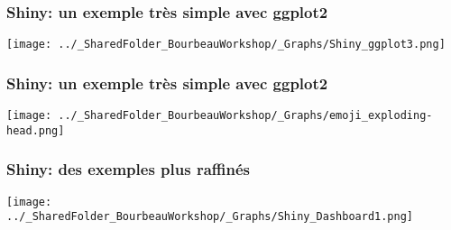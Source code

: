 \documentclass{beamer}
\begin{document}

    \begin{frame}
    
      \frametitle{Shiny: un exemple très simple avec ggplot2} \vspace{1cm}
      
        \begin{center}
      	  \texttt{[image: ../\_SharedFolder\_BourbeauWorkshop/\_Graphs/Shiny\_ggplot3.png]}
        \end{center} 
      
          
    \end{frame} 
    

    \begin{frame}
    
      \frametitle{Shiny: un exemple très simple avec ggplot2} \vspace{1cm}
      
        \begin{center}
      	  \texttt{[image: ../\_SharedFolder\_BourbeauWorkshop/\_Graphs/emoji\_exploding-head.png]}
        \end{center} 
      
          
    \end{frame}     
    
    

    \begin{frame}
    
      \frametitle{Shiny: des exemples plus raffinés} \vspace{1cm}
      
        \begin{center}
      	  \texttt{[image: ../\_SharedFolder\_BourbeauWorkshop/\_Graphs/Shiny\_Dashboard1.png]}
        \end{center} 
      
          
    \end{frame}  
    

    
\end{document}
